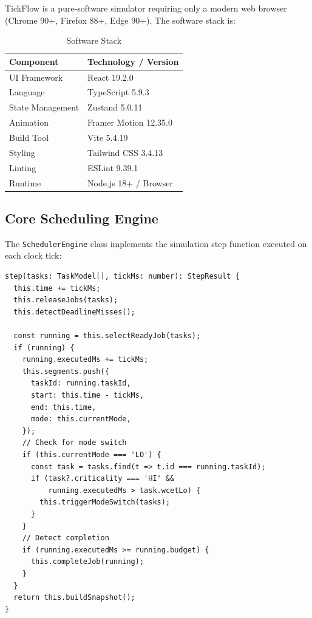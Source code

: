 \documentclass[conference]{IEEEtran}
\begin{document}
TickFlow is a pure-software simulator requiring only a modern web browser (Chrome 90+, Firefox 88+, Edge 90+). The software stack is:

\begin{table}[h]
  \caption{Software Stack}
  \centering
  \begin{tabular}{ll}
    \toprule
    \textbf{Component} & \textbf{Technology / Version} \\
    \midrule
    UI Framework & React 19.2.0 \\
    Language & TypeScript 5.9.3 \\
    State Management & Zustand 5.0.11 \\
    Animation & Framer Motion 12.35.0 \\
    Build Tool & Vite 5.4.19 \\
    Styling & Tailwind CSS 3.4.13 \\
    Linting & ESLint 9.39.1 \\
    Runtime & Node.js 18+ / Browser \\
    \bottomrule
  \end{tabular}
  \label{tab:stack}
\end{table}

\subsection{Core Scheduling Engine}

The \texttt{SchedulerEngine} class implements the simulation step function executed on each clock tick:

\begin{lstlisting}[caption={Core scheduler step function (SchedulerEngine.ts)},label={lst:step}]
step(tasks: TaskModel[], tickMs: number): StepResult {
  this.time += tickMs;
  this.releaseJobs(tasks);
  this.detectDeadlineMisses();

  const running = this.selectReadyJob(tasks);
  if (running) {
    running.executedMs += tickMs;
    this.segments.push({
      taskId: running.taskId,
      start: this.time - tickMs,
      end: this.time,
      mode: this.currentMode,
    });
    // Check for mode switch
    if (this.currentMode === 'LO') {
      const task = tasks.find(t => t.id === running.taskId);
      if (task?.criticality === 'HI' &&
          running.executedMs > task.wcetLo) {
        this.triggerModeSwitch(tasks);
      }
    }
    // Detect completion
    if (running.executedMs >= running.budget) {
      this.completeJob(running);
    }
  }
  return this.buildSnapshot();
}
\end{lstlisting}
\end{document}

